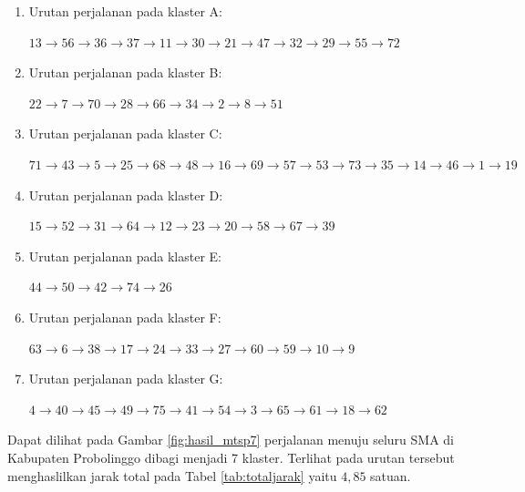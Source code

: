 \begin{enumerate}

\item Urutan perjalanan pada klaster A:

$13\rightarrow56\rightarrow36\rightarrow37\rightarrow11\rightarrow30\rightarrow21\rightarrow47\rightarrow32\rightarrow29\rightarrow55\rightarrow72$

\item Urutan perjalanan pada klaster B:

$22\rightarrow7\rightarrow70\rightarrow28\rightarrow66\rightarrow34\rightarrow2\rightarrow8\rightarrow51$

\item Urutan perjalanan pada klaster C:

$71\rightarrow43\rightarrow5\rightarrow25\rightarrow68\rightarrow48\rightarrow16\rightarrow69\rightarrow57\rightarrow53\rightarrow73\rightarrow35\rightarrow14\rightarrow46\rightarrow1\rightarrow19$

\item Urutan perjalanan pada klaster D:

$15\rightarrow52\rightarrow31\rightarrow64\rightarrow12\rightarrow23\rightarrow20\rightarrow58\rightarrow67\rightarrow39$

\item Urutan perjalanan pada klaster E:

$44\rightarrow50\rightarrow42\rightarrow74\rightarrow26$

\item Urutan perjalanan pada klaster F:

$63\rightarrow6\rightarrow38\rightarrow17\rightarrow24\rightarrow33\rightarrow27\rightarrow60\rightarrow59\rightarrow10\rightarrow9$

\item Urutan perjalanan pada klaster G:

$4\rightarrow40\rightarrow45\rightarrow49\rightarrow75\rightarrow41\rightarrow54\rightarrow3\rightarrow65\rightarrow61\rightarrow18\rightarrow62$

\end{enumerate}

Dapat dilihat pada Gambar \ref{fig:hasil_mtsp7} perjalanan menuju seluru SMA di Kabupaten Probolinggo dibagi menjadi 7 klaster. Terlihat pada urutan tersebut menghaslilkan jarak total pada Tabel \ref{tab:totaljarak} yaitu $4,85$ satuan.


